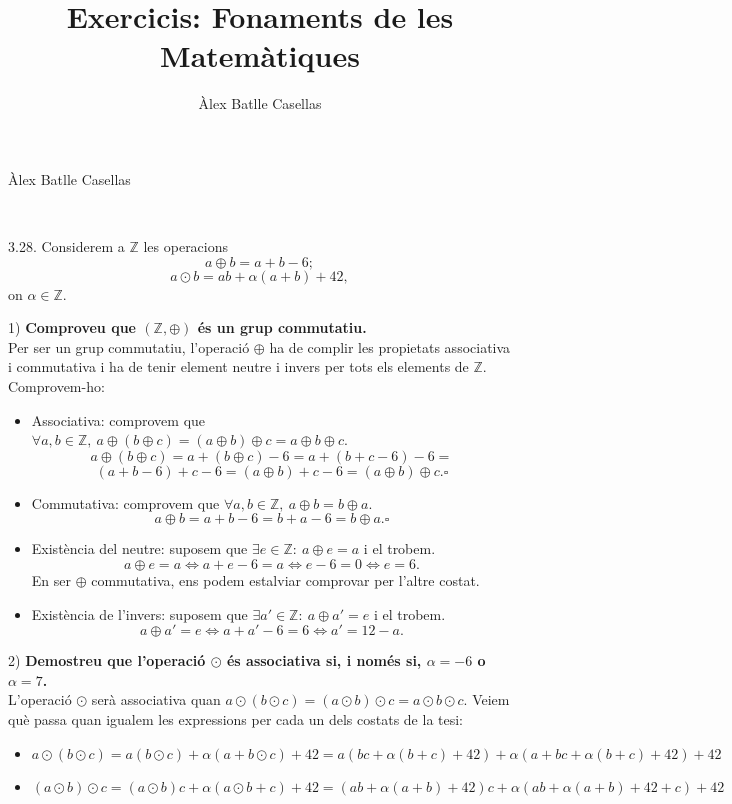 \documentclass[11pt]{article}
\title{Exercicis: Fonaments de les Matemàtiques}
\author{Àlex Batlle Casellas}
\begin{document}
\begin{small}
Àlex Batlle Casellas
\end{small}\\

\begin{legal}
\item[3.28.] Considerem a $\mathbb{Z}$ les operacions
	$$a\oplus b=a+b-6;$$
	$$a\odot b=ab+\alpha(a+b)+42,$$
	on $\alpha\in\mathbb{Z}$.
	\begin{legal}
		\item[1)] \textbf{Comproveu que $(\mathbb{Z},\oplus)$ és un grup commutatiu.}\\
		Per ser un grup commutatiu, l'operació $\oplus$ ha de complir les propietats associativa i commutativa i ha de tenir element neutre i invers per tots els elements de $\mathbb{Z}$. Comprovem-ho:
		\begin{itemize}
			\item Associativa: comprovem que $\forall a,b\in\mathbb{Z},\ a\oplus(b\oplus c)=(a\oplus b)\oplus c=a\oplus b\oplus c$.
			$$a\oplus(b\oplus c)=a+(b\oplus c)-6=a+(b+c-6)-6=$$
			$$(a+b-6)+c-6=(a\oplus b)+c-6=(a\oplus b)\oplus c.\square$$
			\item Commutativa: comprovem que $\forall a,b\in\mathbb{Z},\ a\oplus b=b\oplus a$.\\
			$$a\oplus b=a+b-6=b+a-6=b\oplus a.\square$$
			\item Existència del neutre: suposem que $\exists e\in\mathbb{Z}:\ a\oplus e=a$ i el trobem.
			$$a\oplus e=a\iff a+e-6=a\iff e-6=0\iff e=6.$$
			En ser $\oplus$ commutativa, ens podem estalviar comprovar per l'altre costat.
			\item Existència de l'invers: suposem que $\exists a'\in\mathbb{Z}:\ a\oplus a'=e$ i el trobem.
			$$a\oplus a'=e\iff a+a'-6=6\iff a'=12-a.$$
		\end{itemize}
		\item[2)] \textbf{Demostreu que l'operació $\odot$ és associativa si, i només si, $\alpha=-6$ o $\alpha=7$.}\\
		L'operació $\odot$ serà associativa quan $a\odot(b\odot c)=(a\odot b)\odot c=a\odot b\odot c$. Veiem què passa quan igualem les expressions per cada un dels costats de la tesi:
		\begin{itemize}
			\item $a\odot(b\odot c)=a(b\odot c)+\alpha(a+b\odot c)+42=a(bc+\alpha(b+c)+42)+\alpha(a+bc+\alpha(b+c)+42)+42$
			\item $(a\odot b)\odot c=(a\odot b)c+\alpha(a\odot b+c)+42=(ab+\alpha(a+b)+42)c+\alpha(ab+\alpha(a+b)+42+c)+42$

\end{itemize}
\end{legal}
\end{legal}
\end{document}
